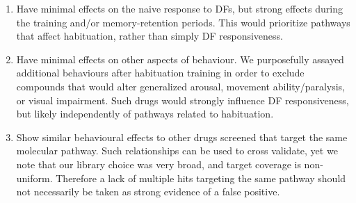 \documentclass[9pt,lineno]{RandlettLab_elife}
\begin{document}
\begin{enumerate}
\item Have minimal effects on the naive response to DFs, but strong effects during the training and/or memory-retention periods. This would prioritize pathways that affect habituation, rather than simply DF responsiveness.

\item Have minimal effects on other aspects of behaviour. We purposefully assayed additional behaviours after habituation training in order to exclude compounds that would alter generalized arousal, movement ability/paralysis, or visual impairment. Such drugs would strongly influence DF responsiveness, but likely independently of pathways related to habituation. 

\item Show similar behavioural effects to other drugs screened that target the same molecular pathway. Such relationships can be used to cross validate, yet we note that our library choice was very broad, and target coverage is non-uniform. Therefore a lack of multiple hits targeting the same pathway should not necessarily be taken as strong evidence of a false positive. 
\end{enumerate}
\end{document}
